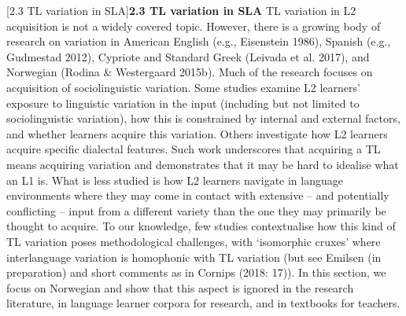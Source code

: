 \documentclass[12pt]{article}
\makeatletter
\renewcommand\section{\@startsection{section}{1}{0.0cm}{0in}{0.1mm}{\normalfont\normalsize\fontsize{12pt}{14.4pt}\selectfont\raggedright}}
\newenvironment{styleStandard}{\renewcommand\baselinestretch{1.0}\setlength\leftskip{0cm}\setlength\rightskip{0cm plus 1fil}\setlength\parindent{0cm}\setlength\parfillskip{0pt plus 1fil}\setlength\parskip{0in plus 1pt}\writerlistparindent\writerlistleftskip\leavevmode\normalfont\normalsize\writerlistlabel\ignorespaces}{\unskip\vspace{0in plus 1pt}\par}
\newcommand\writerlistleftskip{}
\newcommand\writerlistparindent{}
\newcommand\writerlistlabel{}
\makeatother
\begin{document}
\section[2.3 TL variation in SLA]{\textbf{2.3 TL variation in SLA}}
\begin{styleStandard}
TL variation in L2 acquisition is not a widely covered topic. However, there is a growing body of research on variation in American English (e.g., Eisenstein 1986), Spanish (e.g., Gudmestad 2012), Cypriote and Standard Greek (Leivada et al. 2017), and Norwegian (Rodina \& Westergaard 2015b). Much of the research focuses on acquisition of sociolinguistic variation. Some studies examine L2 learners’ exposure to linguistic variation in the input (including but not limited to sociolinguistic variation), how this is constrained by internal and external factors, and whether learners acquire this variation. Others investigate how L2 learners acquire specific dialectal features. Such work underscores that acquiring a TL means acquiring variation and demonstrates that it may be hard to idealise what an L1 is. What is less studied is how L2 learners navigate in language environments where they may come in contact with extensive – and potentially conflicting – input from a different variety than the one they may primarily be thought to acquire. To our knowledge, few studies contextualise how this kind of TL variation poses methodological challenges, with ‘isomorphic cruxes’ where interlanguage variation is homophonic with TL variation (but see Emilsen (in preparation) and short comments as in Cornips (2018: 17)). In this section, we focus on Norwegian and show that this aspect is ignored in the research literature, in language learner corpora for research, and in textbooks for teachers.
\end{styleStandard}
\end{document}
